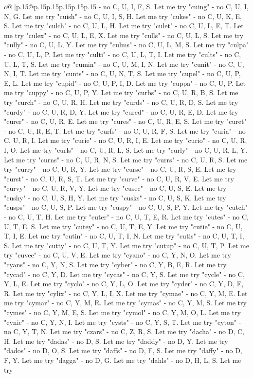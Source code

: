 \documentclass{article}
\begin{document}
{\begin{supertabular}{c@{$\;$}|p{.15\linewidth}@{}p{.15\linewidth}p{.15\linewidth}p{.15\linewidth}p{.15\linewidth}p{.15\linewidth}}
{{{{-} no C, U, I, F, S. Let me try "cuing" {-} no C, U, I, N, G. Let me try "cuish" {-} no C, U, I, S, H. Let me try "cukes" {-} no C, U, K, E, S. Let me try "culch" {-} no C, U, L, H. Let me try "culet" {-} no C, U, L, E, T. Let me try "culex" {-} no C, U, L, E, X. Let me try "culls" {-} no C, U, L, S. Let me try "cully" {-} no C, U, L, Y. Let me try "culms" {-} no C, U, L, M, S. Let me try "culpa" {-} no C, U, L, P. Let me try "culti" {-} no C, U, L, T, I. Let me try "cults" {-} no C, U, L, T, S. Let me try "cumin" {-} no C, U, M, I, N. Let me try "cunit" {-} no C, U, N, I, T. Let me try "cunts" {-} no C, U, N, T, S. Let me try "cupel" {-} no C, U, P, E, L. Let me try "cupid" {-} no C, U, P, I, D. Let me try "cuppa" {-} no C, U, P. Let me try "cuppy" {-} no C, U, P, Y. Let me try "curbs" {-} no C, U, R, B, S. Let me try "curch" {-} no C, U, R, H. Let me try "curds" {-} no C, U, R, D, S. Let me try "curdy" {-} no C, U, R, D, Y. Let me try "cured" {-} no C, U, R, E, D. Let me try "curer" {-} no C, U, R, E. Let me try "cures" {-} no C, U, R, E, S. Let me try "curet" {-} no C, U, R, E, T. Let me try "curfs" {-} no C, U, R, F, S. Let me try "curia" {-} no C, U, R, I. Let me try "curie" {-} no C, U, R, I, E. Let me try "curio" {-} no C, U, R, I, O. Let me try "curls" {-} no C, U, R, L, S. Let me try "curly" {-} no C, U, R, L, Y. Let me try "curns" {-} no C, U, R, N, S. Let me try "currs" {-} no C, U, R, S. Let me try "curry" {-} no C, U, R, Y. Let me try "curse" {-} no C, U, R, S, E. Let me try "curst" {-} no C, U, R, S, T. Let me try "curve" {-} no C, U, R, V, E. Let me try "curvy" {-} no C, U, R, V, Y. Let me try "cusec" {-} no C, U, S, E. Let me try "cushy" {-} no C, U, S, H, Y. Let me try "cusks" {-} no C, U, S, K. Let me try "cusps" {-} no C, U, S, P. Let me try "cuspy" {-} no C, U, S, P, Y. Let me try "cutch" {-} no C, U, T, H. Let me try "cuter" {-} no C, U, T, E, R. Let me try "cutes" {-} no C, U, T, E, S. Let me try "cutey" {-} no C, U, T, E, Y. Let me try "cutie" {-} no C, U, T, I, E. Let me try "cutin" {-} no C, U, T, I, N. Let me try "cutis" {-} no C, U, T, I, S. Let me try "cutty" {-} no C, U, T, Y. Let me try "cutup" {-} no C, U, T, P. Let me try "cuvee" {-} no C, U, V, E. Let me try "cyano" {-} no C, Y, N, O. Let me try "cyans" {-} no C, Y, N, S. Let me try "cyber" {-} no C, Y, B, E, R. Let me try "cycad" {-} no C, Y, D. Let me try "cycas" {-} no C, Y, S. Let me try "cycle" {-} no C, Y, L, E. Let me try "cyclo" {-} no C, Y, L, O. Let me try "cyder" {-} no C, Y, D, E, R. Let me try "cylix" {-} no C, Y, L, I, X. Let me try "cymae" {-} no C, Y, M, E. Let me try "cymar" {-} no C, Y, M, R. Let me try "cymas" {-} no C, Y, M, S. Let me try "cymes" {-} no C, Y, M, E, S. Let me try "cymol" {-} no C, Y, M, O, L. Let me try "cynic" {-} no C, Y, N, I. Let me try "cysts" {-} no C, Y, S, T. Let me try "cyton" {-} no C, Y, T, N. Let me try "czars" {-} no C, Z, R, S. Let me try "dacha" {-} no D, C, H. Let me try "dadas" {-} no D, S. Let me try "daddy" {-} no D, Y. Let me try "dados" {-} no D, O, S. Let me try "daffs" {-} no D, F, S. Let me try "daffy" {-} no D, F, Y. Let me try "dagga" {-} no D, G. Let me try "dahls" {-} no D, H, L, S. Let me try }}}
\end{supertabular}}
\end{document}
